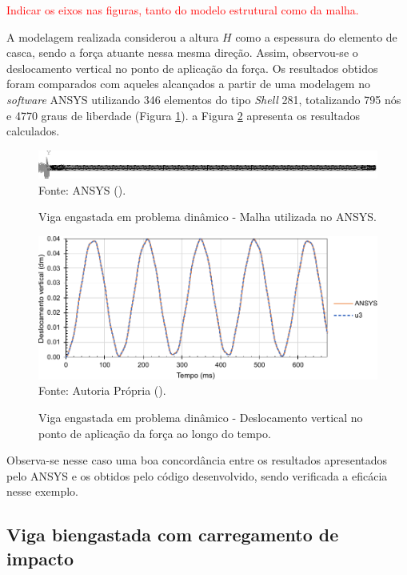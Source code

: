 \textcolor{red}{Indicar os eixos nas figuras, tanto do modelo estrutural como da malha.}

A modelagem realizada considerou a altura $H$ como a espessura do elemento de casca, sendo a força atuante nessa mesma direção. Assim, observou-se o deslocamento vertical no ponto de aplicação da força. Os resultados obtidos foram comparados com aqueles alcançados a partir de uma modelagem no \textit{software} ANSYS utilizando 346 elementos do tipo \textit{Shell} 281, totalizando 795 nós e 4770 graus de liberdade (Figura \ref{fig:beamANSYS1}). a Figura \ref{fig:res-viga1} apresenta os resultados calculados.

\begin{figure}[h!]
    \centering
    \caption{Viga engastada em problema dinâmico - Malha utilizada no ANSYS.}
    \includegraphics[width=\linewidth]{Figuras/vigas/ANSYSmesh1.png}
    \\Fonte: ANSYS (\the\year).
    \label{fig:beamANSYS1}
\end{figure}

\begin{figure}[h!]
    \centering
    \caption{Viga engastada em problema dinâmico - Deslocamento vertical no ponto de aplicação da força ao longo do tempo.}
    \includegraphics[width=.8\linewidth]{Figuras/vigas/res1.pdf}
    \\Fonte: Autoria Própria (\the\year).
    \label{fig:res-viga1}
\end{figure}

Observa-se nesse caso uma boa concordância entre os resultados apresentados pelo ANSYS e os obtidos pelo código desenvolvido, sendo verificada a eficácia nesse exemplo.

\subsection{Viga biengastada com carregamento de impacto} \label{Ap:DinBeam2}

